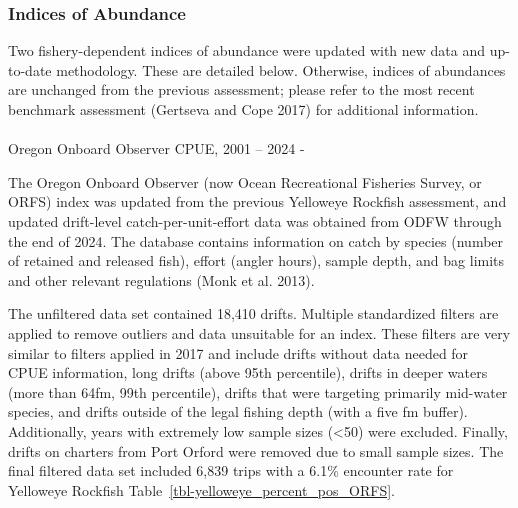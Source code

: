 \documentclass[
]{scrartcl}
\makeatletter
\let\oldparagraph\paragraph
\renewcommand{\paragraph}{
    \@ifstar
      \xxxParagraphStar
      \xxxParagraphNoStar
  }
\newcommand{\xxxParagraphStar}[1]{\oldparagraph*{#1}\mbox{}}
\newcommand{\xxxParagraphNoStar}[1]{\oldparagraph{#1}\mbox{}}
\makeatother
\begin{document}
\subsubsection{Indices of Abundance}\label{indices-of-abundance}

Two fishery-dependent indices of abundance were updated with new data
and up-to-date methodology. These are detailed below. Otherwise, indices
of abundances are unchanged from the previous assessment; please refer
to the most recent benchmark assessment (Gertseva and Cope 2017) for
additional information.

\paragraph{Oregon Onboard Observer CPUE, 2001 -- 2024
-}\label{oregon-onboard-observer-cpue-2001-2024--}

The Oregon Onboard Observer (now Ocean Recreational Fisheries Survey, or
ORFS) index was updated from the previous Yelloweye Rockfish assessment,
and updated drift-level catch-per-unit-effort data was obtained from
ODFW through the end of 2024. The database contains information on catch
by species (number of retained and released fish), effort (angler
hours), sample depth, and bag limits and other relevant regulations
(Monk et al. 2013).

The unfiltered data set contained 18,410 drifts. Multiple standardized
filters are applied to remove outliers and data unsuitable for an index.
These filters are very similar to filters applied in 2017 and include
drifts without data needed for CPUE information, long drifts (above 95th
percentile), drifts in deeper waters (more than 64fm, 99th percentile),
drifts that were targeting primarily mid-water species, and drifts
outside of the legal fishing depth (with a five fm buffer).
Additionally, years with extremely low sample sizes (\textless50) were
excluded. Finally, drifts on charters from Port Orford were removed due
to small sample sizes. The final filtered data set included 6,839 trips
with a 6.1\% encounter rate for Yelloweye Rockfish
Table~\ref{tbl-yelloweye_percent_pos_ORFS}.
\end{document}
